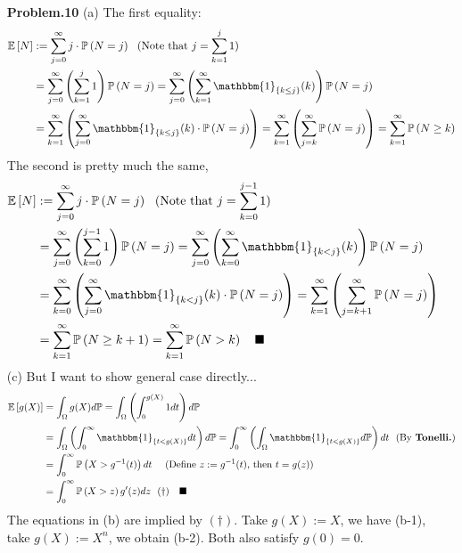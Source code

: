 \documentclass[a4paper, 11pt]{article}
\begin{document}
\begin{itemize}
	\item[\textbf{Problem.10}] (a) The first equality:
	\begin{equation}
		\begin{split}
			\mathbb{E}\left[N\right]&:=\sum_{j=0}^{\infty} j \cdot\mathbb{P}\left(N=j\right)~~(\text{Note that $j=\sum_{k=1}^j 1$})\\
			&=\sum_{j=0}^{\infty} \left(\sum_{k=1}^j 1\right)\mathbb{P}\left(N=j\right)=\sum_{j=0}^{\infty} \left(\sum_{k=1}^{\infty} \mathbbm{1}_{\{k\leq j\}}(k)\right)\mathbb{P}\left(N=j\right)\\
			&=\sum_{k=1}^{\infty} \left(\sum_{j=0}^{\infty} \mathbbm{1}_{\{k\leq j\}}(k)\cdot\mathbb{P}\left(N=j\right)\right)=\sum_{k=1}^{\infty} \left(\sum_{j=k}^{\infty} \mathbb{P}\left(N=j\right)\right)=\sum_{k=1}^{\infty} \mathbb{P}\left(N\geq k\right)
		\end{split}
	\end{equation}
	The second is pretty much the same,
	\begin{equation}
		\begin{split}
			\mathbb{E}\left[N\right]&:=\sum_{j=0}^{\infty} j \cdot\mathbb{P}\left(N=j\right)~~(\text{Note that $j=\sum_{k=0}^{j-1} 1$})\\
			&=\sum_{j=0}^{\infty} \left(\sum_{k=0}^{j-1} 1\right)\mathbb{P}\left(N=j\right)=\sum_{j=0}^{\infty} \left(\sum_{k=0}^{\infty} \mathbbm{1}_{\{k<j\}}(k)\right)\mathbb{P}\left(N=j\right)\\
			&=\sum_{k=0}^{\infty} \left(\sum_{j=0}^{\infty} \mathbbm{1}_{\{k< j\}}(k)\cdot\mathbb{P}\left(N=j\right)\right)=\sum_{k=1}^{\infty} \left(\sum_{j=k+1}^{\infty} \mathbb{P}\left(N=j\right)\right)\\
			&=\sum_{k=1}^{\infty} \mathbb{P}\left(N\geq k+1\right)=\sum_{k=1}^{\infty} \mathbb{P}\left(N> k\right)~~~\blacksquare
		\end{split}
	\end{equation}
	(c) But I want to show general case directly...
	\begin{equation}
		\begin{split}
			\mathbb{E}\left[g(X)\right] &= \int_{\Omega} g(X) d\mathbb{P} = \int_{\Omega} \left(\int_0^{g(X)} 1 dt\right) d\mathbb{P} \\
			&=\int_{\Omega} \left(\int_0^{\infty} \mathbbm{1}_{\{t<g(X)\}} dt\right) d\mathbb{P}=\int_0^{\infty} \left( \int_{\Omega}\mathbbm{1}_{\{t<g(X)\}} d\mathbb{P} \right) dt ~~(\text{By \textbf{Tonelli.}})\\
			&=\int_0^{\infty} \mathbb{P}\left(X>g^{-1}(t)\right) dt~~~~(\text{Define $z:=g^{-1}(t)$, then $t=g(z)$})\\
			&=\int_0^{\infty} \mathbb{P}\left(X>z\right) g'(z)dz~~(\dagger)~~~\blacksquare
		\end{split}
	\end{equation}
	The equations in (b) are implied by $(\dagger)$. Take $g(X):=X$, we have (b-1), take $g(X):=X^n$, we obtain (b-2). Both also satisfy $g(0)=0$.
\end{itemize}
\end{document}

